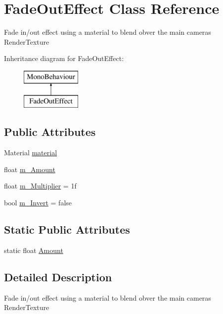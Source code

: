 \hypertarget{class_fade_out_effect}{}\section{Fade\+Out\+Effect Class Reference}
\label{class_fade_out_effect}


Fade in/out effect using a material to blend obver the main camera\textquotesingle{}s Render\+Texture  


Inheritance diagram for Fade\+Out\+Effect\+:\begin{figure}[H]
\begin{center}
\leavevmode
\includegraphics[height=2.000000cm]{class_fade_out_effect}
\end{center}
\end{figure}
\subsection*{Public Attributes}
\begin{DoxyCompactItemize}
\item 
Material \mbox{\hyperlink{class_fade_out_effect_a83a58cb79fe762c863c3eaafece22a1f}{material}}
\item 
float \mbox{\hyperlink{class_fade_out_effect_a39a131a475ba9b43aa3415917098f316}{m\+\_\+\+Amount}}
\item 
float \mbox{\hyperlink{class_fade_out_effect_a5e9ce8885ef21f947dad790e1756caac}{m\+\_\+\+Multiplier}} = 1f
\item 
bool \mbox{\hyperlink{class_fade_out_effect_a83f178e53cc0b59b5213b106f73767cb}{m\+\_\+\+Invert}} = false
\end{DoxyCompactItemize}
\subsection*{Static Public Attributes}
\begin{DoxyCompactItemize}
\item 
static float \mbox{\hyperlink{class_fade_out_effect_ade319a3793dfb08826bae81d06e1f631}{Amount}}
\end{DoxyCompactItemize}


\subsection{Detailed Description}
Fade in/out effect using a material to blend obver the main camera\textquotesingle{}s Render\+Texture 



